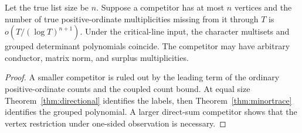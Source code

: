 \begin{corollary}\label{cor:optimal-heading}
Let the true list size be $n$. Suppose a competitor has at most $n$ vertices and the number of true positive-ordinate multiplicities missing from it through $T$ is $o(T/(\log T)^{n+1})$. Under the critical-line input, the character multisets and grouped determinant polynomials coincide. The competitor may have arbitrary conductor, matrix norm, and surplus multiplicities.
\end{corollary}
\begin{proof}
A smaller competitor is ruled out by the leading term of the ordinary positive-ordinate counts and the coupled count bound. At equal size Theorem~\ref{thm:directional} identifies the labels, then Theorem~\ref{thm:minortrace} identifies the grouped polynomial. A larger direct-sum competitor shows that the vertex restriction under one-sided observation is necessary.
\end{proof}
